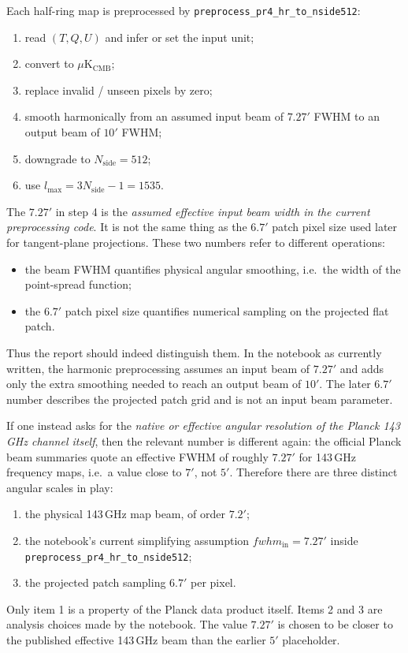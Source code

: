 \documentclass[11pt]{article}
\begin{document}
Each half-ring map is preprocessed by \texttt{preprocess\_pr4\_hr\_to\_nside512}:
\begin{enumerate}[leftmargin=1.5em]
  \item read \((T,Q,U)\) and infer or set the input unit;
  \item convert to \(\mu\mathrm{K}_{\mathrm{CMB}}\);
  \item replace invalid / unseen pixels by zero;
  \item smooth harmonically from an assumed input beam of \(7.27'\) FWHM to an output beam of \(10'\) FWHM;
  \item downgrade to \(N_{\mathrm{side}}=512\);
  \item use \(l_{\max}=3N_{\mathrm{side}}-1 = 1535\).
\end{enumerate}

The \(7.27'\) in step 4 is the \emph{assumed effective input beam width in the current preprocessing code}. It is not the same thing as the \(6.7'\) patch pixel size used later for tangent-plane projections. These two numbers refer to different operations:
\begin{itemize}[leftmargin=1.5em]
  \item the beam FWHM quantifies physical angular smoothing, i.e.\ the width of the point-spread function;
  \item the \(6.7'\) patch pixel size quantifies numerical sampling on the projected flat patch.
\end{itemize}
Thus the report should indeed distinguish them. In the notebook as currently written, the harmonic preprocessing assumes an input beam of \(7.27'\) and adds only the extra smoothing needed to reach an output beam of \(10'\). The later \(6.7'\) number describes the projected patch grid and is not an input beam parameter.

If one instead asks for the \emph{native or effective angular resolution of the Planck 143\,GHz channel itself}, then the relevant number is different again: the official Planck beam summaries quote an effective FWHM of roughly \(7.27'\) for 143\,GHz frequency maps, i.e.\ a value close to \(7'\), not \(5'\). Therefore there are three distinct angular scales in play:
\begin{enumerate}[leftmargin=1.5em]
  \item the physical 143\,GHz map beam, of order \(7.2'\);
  \item the notebook's current simplifying assumption \(fwhm_{\mathrm{in}}=7.27'\) inside \texttt{preprocess\_pr4\_hr\_to\_nside512};
  \item the projected patch sampling \(6.7'\) per pixel.
\end{enumerate}
Only item 1 is a property of the Planck data product itself. Items 2 and 3 are analysis choices made by the notebook. The value \(7.27'\) is chosen to be closer to the published effective 143\,GHz beam than the earlier \(5'\) placeholder.
\end{document}
